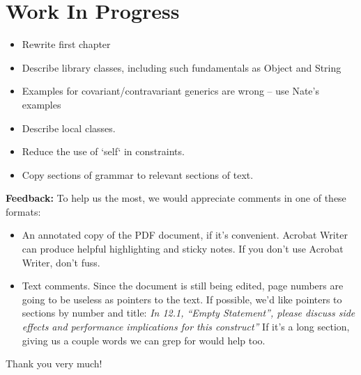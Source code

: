 \documentclass[12pt,twoside,notitlepage]{report}
\begin{document}
\section{Work In Progress}
\begin{itemize}
    \item Rewrite first chapter
    \item Describe library classes, including such fundamentals as Object and String
    \item Examples for covariant/contravariant generics are wrong -- use Nate's examples
    \item Describe local classes.
    \item Reduce the use of \xcd`self` in constraints.
    \item Copy sections of grammar to relevant sections of text.
\end{itemize}

{\bf Feedback:} 
To help us the most, we would appreciate comments in one of these formats: 
\begin{itemize}
\item An annotated copy of the PDF document, if it's convenient.  Acrobat
      Writer can produce helpful highlighting and sticky notes.  If you don't
      use Acrobat Writer, don't fuss.
\item Text comments.  Since the document is still being edited, page numbers
      are going to be useless as pointers to the text.  If possible, we'd like
      pointers to sections by number and title: {\em In 12.1, ``Empty
      Statement'', please discuss side effects and performance implications
      for this construct''}  If it's a long section, giving us a couple words
      we can grep for would help too.
\end{itemize}

Thank you very much!






 

\clearpage

{\parskip 0pt
\addtolength{\cftsecnumwidth}{0.5em}
\addtolength{\cftsubsecnumwidth}{0.5em}
\addtolength{\cftsubsecindent}{0.5em}
\tableofcontents
}





	






	
	
	
	
	
	



\renewcommand{\bibname}{References}


\end{document}

